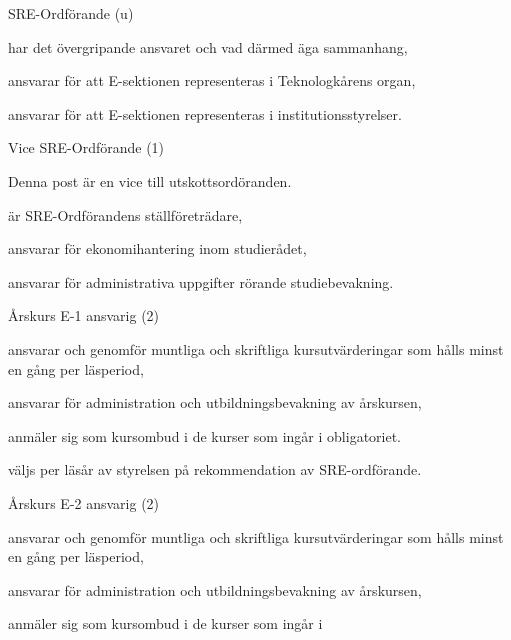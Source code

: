 \documentclass[10pt]{article}
\begin{document}
\begin{emptylist}
    \item SRE-Ordförande (u)
        \begin{dashlist}
            \item har det övergripande ansvaret och vad därmed äga
                sammanhang,
            \item ansvarar för att E-sektionen representeras i
                Teknologkårens organ,
            \item ansvarar för att E-sektionen representeras i
                institutionsstyrelser.
        \end{dashlist}
    \item Vice SRE-Ordförande (1)
        \begin{dashlist}
            \item Denna post är en vice till utskottsordöranden.
            \item är SRE-Ordförandens ställföreträdare,
            \item ansvarar för ekonomihantering inom studierådet,
            \item ansvarar för administrativa uppgifter rörande
                studiebevakning.
        \end{dashlist}
    \item Årskurs E-1 ansvarig (2)
        \begin{dashlist}
            \item ansvarar och genomför muntliga och skriftliga
                kursutvärderingar som hålls minst en gång per läsperiod,
            \item ansvarar för administration och utbildningsbevakning av
                årskursen,
            \item anmäler sig som kursombud i de kurser som ingår i
                obligatoriet.
            \item väljs per läsår av styrelsen på rekommendation av SRE-ordförande.
        \end{dashlist}
    \item Årskurs E-2 ansvarig (2)
        \begin{dashlist}
            \item ansvarar och genomför muntliga och skriftliga
                kursutvärderingar som hålls minst en gång per läsperiod,
            \item ansvarar för administration och utbildningsbevakning av
                årskursen,
            \item anmäler sig som kursombud i de kurser som ingår i

\end{dashlist}
\end{emptylist}
\end{document}
